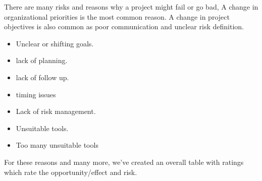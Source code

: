 There are many risks and reasons why a project might fail or go bad, A change in organizational priorities is the most common reason. A change in project objectives is also common as poor communication and unclear risk definition.
	\begin{itemize}
		\setlength\itemsep{-0.2em}
		\item Unclear or shifting goals.
		\item lack of planning.
		\item lack of follow up.
		\item timing issues 
		\item Lack of risk management.
		\item Unsuitable tools.
		\item Too many unsuitable tools
	\end{itemize}

\noindent
For these reasons and many more, we’ve created an overall table with ratings which rate the opportunity/effect and risk.
	
